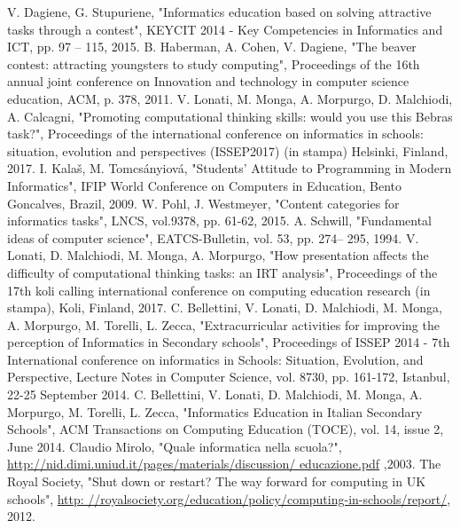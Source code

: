 \documentclass[12pt]{report}
\begin{document}
\begin{thebibliography}{00}
%
V. Dagiene, G. Stupuriene, 
"Informatics education based on solving attractive tasks through a contest", 
KEYCIT 2014 - Key Competencies in Informatics and ICT, 
pp. 97 – 115, 
2015.
%
B. Haberman, A. Cohen, V. Dagiene, 
"The beaver contest: attracting youngsters to study computing", 
Proceedings of the 16th annual joint conference on Innovation and technology in computer science education, ACM, 
p. 378, 
2011.
%
V. Lonati, M. Monga, A. Morpurgo, D. Malchiodi, A. Calcagni, 
"Promoting computational thinking skills: would you use this Bebras task?", 
Proceedings of the international conference on informatics in schools: situation, evolution and perspectives (ISSEP2017) (in stampa) 
Helsinki, Finland, 
2017.
%
I. Kalaš, M. Tomcsányiová, 
"Students’ Attitude to Programming in Modern Informatics", 
IFIP World Conference on Computers in Education, 
Bento Goncalves, Brazil, 
2009.
%
W. Pohl, J. Westmeyer, 
"Content categories for informatics tasks", 
LNCS, vol.9378, 
pp. 61-62,
2015. 
%
A. Schwill, 
"Fundamental ideas of computer science", 
EATCS-Bulletin, vol. 53, 
pp. 274– 295, 
1994.
%
V. Lonati, D. Malchiodi, M. Monga, A. Morpurgo, 
"How presentation affects the difficulty of computational thinking tasks: an IRT analysis", 
Proceedings of the 17th koli calling international conference on computing education research (in stampa),
Koli, Finland, 
2017.
%
C. Bellettini, V. Lonati, D. Malchiodi, M. Monga, A. Morpurgo, M. Torelli, L. Zecca,
"Extracurricular activities for improving the perception of Informatics in Secondary schools",
Proceedings of ISSEP 2014 - 7th International conference on informatics in Schools: Situation, Evolution, and Perspective, 
Lecture Notes in Computer Science, 
vol. 8730, pp. 161-172,
Istanbul,
22-25 September 
2014.
%
C. Bellettini, V. Lonati, D. Malchiodi, M. Monga, A. Morpurgo, M. Torelli, L. Zecca,
"Informatics Education in Italian Secondary Schools",
ACM Transactions on Computing Education (TOCE), 
vol. 14, issue 2,
June 
2014.
%
Claudio Mirolo, "Quale informatica nella scuola?", \url{http://nid.dimi.uniud.it/pages/materials/discussion/ educazione.pdf} ,2003.
%
The Royal Society, "Shut down or restart? The way forward for computing in UK schools", \url{http: //royalsociety.org/education/policy/computing-in-schools/report/}, 2012.
%

\end{thebibliography}
\end{document}
